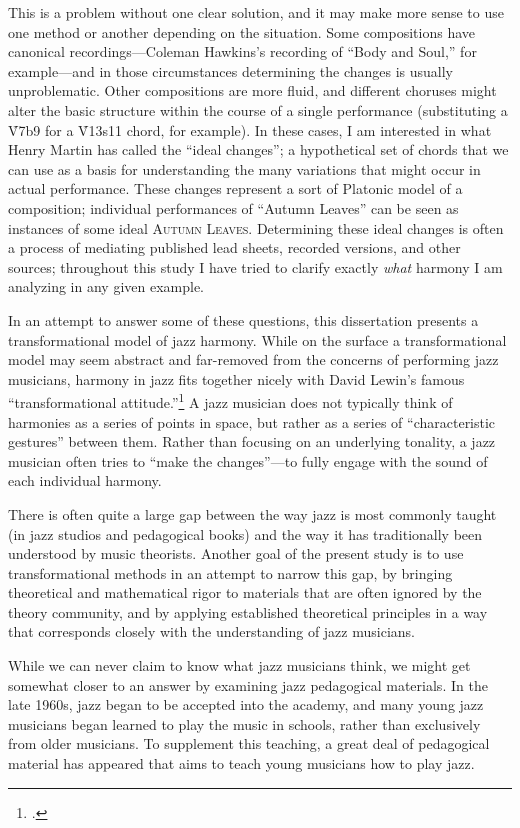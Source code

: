 \documentclass[diss]{subfiles}
\begin{document}
This is a problem without one clear solution, and it may make more sense to
use one method or another depending on the situation. Some compositions have
canonical recordings---Coleman Hawkins’s recording of “Body and Soul,” for
example---and in those circumstances determining the changes is usually
unproblematic. Other compositions are more fluid, and different choruses might
alter the basic structure within the course of a single performance
(substituting a \h{V7b9} for a \h{V13s11} chord, for example). In these
cases, I am interested in what Henry Martin has called the “ideal changes”; a
hypothetical set of chords that we can use as a basis for understanding the
many variations that might occur in actual performance. These
changes represent a sort of Platonic model of a composition; individual
performances of “Autumn Leaves” can be seen as instances of some ideal
\textsc{Autumn Leaves}. Determining these ideal changes is often a process
of mediating published lead sheets, recorded versions, and other sources;
throughout this study I have tried to clarify exactly \emph{what} harmony I am
analyzing in any given example.

In an attempt to answer some of these questions, this dissertation presents a
transformational model of jazz harmony. While on the surface a
transformational model may seem abstract and far-removed from the concerns of
performing jazz musicians, harmony in jazz fits together nicely with David
Lewin’s famous “transformational attitude.”\footcite[][159 (hereafter
\emph{GMIT)}]{lewin:gmit} A jazz
musician does not typically think of harmonies as a series of points in space,
but rather as a series of “characteristic gestures” between them. Rather than
focusing on an underlying tonality, a jazz musician often tries to “make the
changes”---to fully engage with the sound of each individual harmony.

There is often quite a large gap between the way jazz is most commonly taught
(in jazz studios and pedagogical books) and the way it has traditionally been
understood by music theorists. Another goal of the present study is to use
transformational methods in an attempt to narrow this gap, by bringing
theoretical and mathematical rigor to materials that are often ignored by the
theory community, and by applying established theoretical principles in a way
that corresponds closely with the understanding of jazz musicians.

While we can never claim to know what jazz musicians think, we might get
somewhat closer to an answer by examining jazz pedagogical materials. In the
late 1960s, jazz began to be accepted into the academy, and many young jazz
musicians began learned to play the music in schools, rather than exclusively
from older musicians. To supplement this teaching, a great deal of
pedagogical material has appeared that aims to teach young musicians how to
play jazz.
\end{document}
